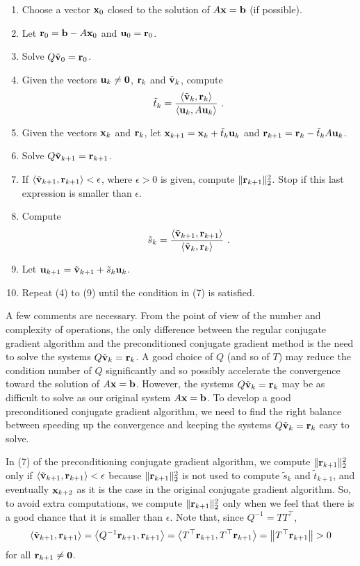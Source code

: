 \begin{algo}
\begin{enumerate}
\item Choose a vector $\mathbf{x}_{0}$ closed to the solution of
$A \mathbf{x} = \mathbf{b}$ (if possible).
\item Let $\mathbf{r}_0 = \mathbf{b}-A\mathbf{x}_0$ and
$\mathbf{u}_0 = \mathbf{r}_0$.
\item Solve $Q\tilde{\mathbf{v}}_0 = \mathbf{r}_0$.
\item Given the vectors $\mathbf{u}_k \neq \mathbf{0}$,
$\mathbf{r}_k$ and $\tilde{\mathbf{v}}_k$, compute
\[
\tilde{t}_k =
\frac{\ps{\tildev{v}_k}{\VEC{r}_k}}{\ps{\VEC{u}_k}{A\VEC{u}_k}} \ .
\]
\item Given the vectors $\mathbf{x}_k$ and $\mathbf{r}_k$, let
$\mathbf{x}_{k+1} = \mathbf{x}_k + \tilde{t}_k \mathbf{u}_k$
and $\mathbf{r}_{k+1} = \mathbf{r}_k - \tilde{t}_k A \mathbf{u}_k$.
\item Solve $Q\tilde{\mathbf{v}}_{k+1} = \mathbf{r}_{k+1}$.
\item If
$\left\langle{\tilde{\mathbf{v}}_{k+1}} , {\mathbf{r}_{k+1}}\right\rangle < \epsilon$, where $\epsilon>0$ is
given, compute $\| \mathbf{r}_{k+1} \|_2^2$.  Stop if this last
expression is smaller than $\epsilon$.
\item Compute
\[
\tilde{s}_k =
\frac{\left\langle{\tilde{\mathbf{v}}_{k+1}} , {\mathbf{r}_{k+1}}\right\rangle}
{\left\langle{\tilde{\mathbf{v}}_k} , {\mathbf{r}_k}\right\rangle} \ .
\]
\item Let
$\mathbf{u}_{k+1} = \tilde{\mathbf{v}}_{k+1} + \tilde{s}_k \mathbf{u}_k$.
\item Repeat (4) to (9) until the condition in (7) is satisfied.
\end{enumerate}
\end{algo}

A few comments are necessary.  From the point of view of the number
and complexity of operations, the only difference between the
regular conjugate gradient algorithm and the preconditioned conjugate
gradient method is the need to solve the systems
$Q\tilde{\mathbf{v}}_k = \mathbf{r}_k$.  A good choice of $Q$ (and so of $T$) may
reduce the condition number of $Q$ significantly and so possibly
accelerate the convergence toward the solution of $A\mathbf{x}=\mathbf{b}$.
However, the systems $Q\tilde{\mathbf{v}}_k = \mathbf{r}_k$ may be as difficult
to solve as our original system $A\mathbf{x} = \mathbf{b}$.  To develop a good
preconditioned conjugate gradient algorithm, we need to find the
right balance between speeding up the convergence and keeping the
systems $Q\tilde{\mathbf{v}}_k = \mathbf{r}_k$ easy to solve.

In (7) of the preconditioning conjugate gradient algorithm, we compute
$\| \mathbf{r}_{k+1} \|_2^2$ only if
$\left\langle{\tilde{\mathbf{v}}_{k+1}} , {\mathbf{r}_{k+1}}\right\rangle < \epsilon$
because $\| \mathbf{r}_{k+1} \|_2^2$ is not used to compute $\tilde{s}_k$ and
$\tilde{t}_{k+1}$, and eventually $\mathbf{x}_{k+2}$ as it is the case in the
original conjugate gradient algorithm.  So, to avoid extra
computations, we compute $\| \mathbf{r}_{k+1} \|_2^2$ only when we feel
that there is a good chance that it is smaller than $\epsilon$.
Note that, since $Q^{-1} = TT^\top$,
\[
\left\langle{\tilde{\mathbf{v}}_{k+1}} , {\mathbf{r}_{k+1}}\right\rangle
= \left\langle{Q^{-1}\mathbf{r}_{k+1}} , {\mathbf{r}_{k+1}}\right\rangle
= \left\langle{T^\top\mathbf{r}_{k+1}} , {T^\top\mathbf{r}_{k+1}}\right\rangle
= \left\| T^\top \mathbf{r}_{k+1}\right\| > 0
\]
for all $\mathbf{r}_{k+1} \neq \mathbf{0}$.

